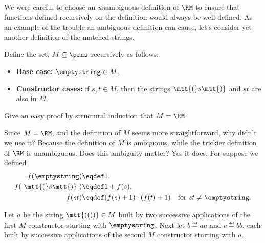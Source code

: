 \begin{definition}

We were careful to choose an \emph{un}ambiguous definition of $\RM$ to
ensure that functions defined recursively on the definition would always
be well-defined.  As an example of the trouble an ambiguous definition can
cause, let's consider yet another definition of the matched strings.

\begin{example}\label{M}
  Define the set, $M \subseteq \prns$ recursively as follows:
\begin{itemize}

\item \textbf{Base case:} $\emptystring \in M$,

\item \textbf{Constructor cases:} if $s,t \in M$, then
the strings $\mtt{(}s\mtt{)}$ and $st$ are also in $M$.
\end{itemize}
\end{example}

\begin{notesproblem}
Give an easy proof by structural induction that $M =\RM$.
\end{notesproblem}

Since $M = \RM$, and the definition of $M$ seems more straightforward, why
didn't we use it?  Because the definition of $M$ is ambiguous, while the
trickier definition of $\RM$ is unambiguous.  Does this ambiguity matter?
Yes it does.  For suppose we defined
\begin{align*}
  f(\emptystring)        & \eqdef 1,\\
  f(\ \mtt{(}s\mtt{)}\ ) & \eqdef 1+ f(s),\\
  f(st)                  & \eqdef (f(s)+1) \cdot (f(t)+1)
                            & \text{for } st\neq \emptystring.
\end{align*}

Let $a$ be the string $\mtt{(())} \in M$ built by two successive
applications of the first $M$ constructor starting with $\emptystring$.  Next
let $b \eqdef aa$ and $c \eqdef bb$, each built by successive applications
of the second $M$ constructor starting with $a$.


\end{definition}
